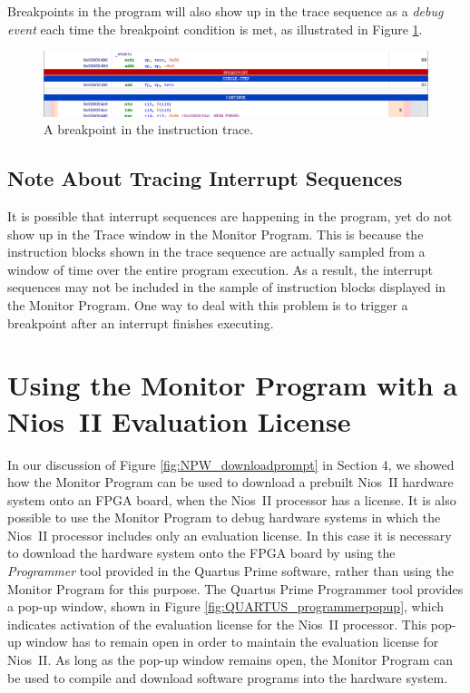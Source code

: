 \documentclass[11pt, twoside, pdftex]{article}
\begin{document}
Breakpoints in the program will also show up in the trace
sequence as a {\it debug event} each time the breakpoint
condition is met, as illustrated in Figure \ref{fig:AMP_trace_breakpoint}.

\begin{figure}[H]
   \begin{center}
      \includegraphics[scale=1]{screenshots/figure66.png}
   \end{center}
   \caption{A breakpoint in the instruction trace.}
   \label{fig:AMP_trace_breakpoint}
\end{figure} 

\subsection{Note About Tracing Interrupt Sequences}
It is possible that interrupt sequences are happening in the
program, yet do not show up in the Trace window in 
the Monitor Program. This is because the instruction blocks
shown in the trace sequence are actually sampled from a window 
of time over the entire program execution. As a result, the
interrupt sequences may not be included in the sample of
instruction blocks displayed in the Monitor Program. 
One way to deal with this problem is to trigger a breakpoint
after an interrupt finishes executing.

\section{Using the Monitor Program with a Nios~II Evaluation License}

In our discussion of Figure \ref{fig:NPW_downloadprompt} in Section 4,
we showed how the Monitor Program can be used to download a
prebuilt Nios~II hardware system onto an FPGA board, when the
Nios~II processor has a license. It is also possible to use the
Monitor Program to debug hardware systems in which the Nios~II
processor includes only an evaluation license. In this case
it is necessary to download the hardware system onto the FPGA
board by using the {\it Programmer} tool provided in the 
Quartus Prime software, rather than using the Monitor Program for
this purpose. The Quartus Prime Programmer tool provides a pop-up
window, shown in Figure \ref{fig:QUARTUS_programmerpopup}, which indicates activation of
the evaluation license for the Nios~II processor. 
This pop-up window has to remain open in order to maintain the
evaluation license for Nios~II. As long as the pop-up
window remains open, the Monitor Program can be used to compile
and download software programs into the hardware system.
\end{document}

